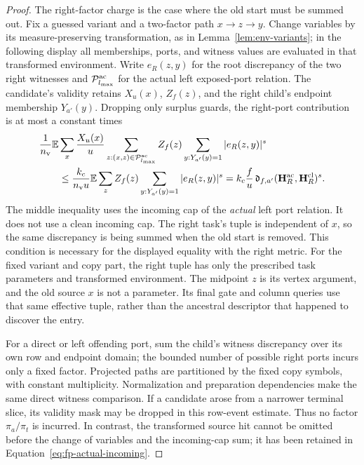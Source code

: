 \documentclass[11pt]{article}
\numberwithin{equation}{section}
\theoremstyle{definition}
\theoremstyle{remark}
\begin{document}
\begin{proof}
The right-factor charge is the case where the old start must be summed
out.  Fix a guessed variant and a two-factor path $x\to z\to y$.
Change variables by its measure-preserving transformation, as in
Lemma~\ref{lem:env-variants}; in the following display all memberships,
ports, and witness values are evaluated in that transformed environment.
Write $e_R(z,y)$ for the root discrepancy of the two right witnesses and
$\mathcal P^{\mathrm{ac}}_{l_{\rm max}}$ for the actual left exposed-port relation.
The candidate's validity retains $X_u(x)$, $Z_f(z)$, and the right
child's endpoint membership $Y_{a'}(y)$.  Dropping only surplus guards,
the right-port contribution is at most a constant times
\begin{align}
 &\frac1{n_{\rm v}}\mathbb E\sum_x\frac{X_u(x)}u
       \sum_{z:(x,z)\in\mathcal P^{\mathrm{ac}}_{l_{\rm max}}}Z_f(z)
       \sum_{y:Y_{a'}(y)=1}|e_R(z,y)|^s \notag\\
 &\qquad\le\frac{{k}_c}{{n_{\rm v}} u}\mathbb E\sum_z Z_f(z)
       \sum_{y:Y_{a'}(y)=1}|e_R(z,y)|^s
   ={k}_c\frac f u\,\mathfrak d_{f,a'}({\mathbf{H}}_R^{\mathrm{ac}},
                                      {\mathbf{H}}_R^{\mathrm{cl}})^s.
 \label{eq:fp-actual-incoming}
\end{align}
The middle inequality uses the incoming cap of the \emph{actual} left
port relation.  It does not use a clean incoming cap.  The right task's
tuple is independent of $x$, so the same discrepancy is being summed
when the old start is removed.  This condition is necessary for the
displayed equality with the right metric.
For the fixed variant and copy part, the right tuple has only the
prescribed task parameters and transformed environment.  The midpoint
$z$ is its vertex argument, and the old source $x$ is not a parameter.
Its final gate and column queries use that same effective tuple, rather
than the ancestral descriptor that happened to discover the entry.

For a direct or left offending port, sum the child's witness discrepancy
over its own row and endpoint domain; the bounded number of possible
right ports incurs only a fixed factor.  Projected paths are partitioned
by the fixed copy symbols, with constant multiplicity.  Normalization
and preparation dependencies make the same direct witness comparison.
If a candidate arose from a narrower terminal slice, its validity mask
may be dropped in this row-event estimate.  Thus no factor
$\pi_a/\pi_t$ is incurred.  In contrast, the transformed source hit
cannot be omitted before the change of variables and the incoming-cap
sum; it has been retained in Equation~\eqref{eq:fp-actual-incoming}.


\end{proof}
\end{document}
